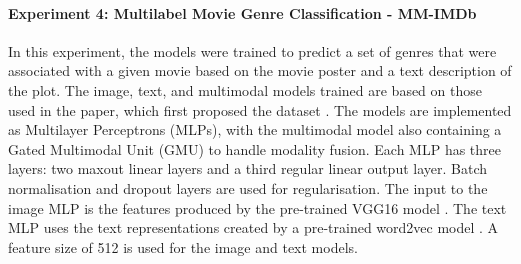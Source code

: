 \paragraph{\textbf{Experiment 4: Multilabel Movie Genre Classification - MM-IMDb}} In this experiment, the models were trained to predict a set of genres that were associated with a given movie based on the movie poster and a text description of the plot. The image, text, and multimodal models trained are based on those used in the paper, which first proposed the dataset \cite{arevalo2017gated}. The models are implemented as Multilayer Perceptrons (MLPs), with the multimodal model also containing a Gated Multimodal Unit (GMU) \cite{arevalo2017gated} to handle modality fusion. Each MLP has three layers: two maxout \cite{pmlr-v28-goodfellow13} linear layers and a third regular linear output layer. Batch normalisation and dropout layers are used for regularisation. The input to the image MLP is the features produced by the pre-trained VGG16 model \cite{7486599}. The text MLP uses the text representations created by a pre-trained word2vec model \cite{mikolov2013efficient}. A feature size of 512 is used for the image and text models. 
